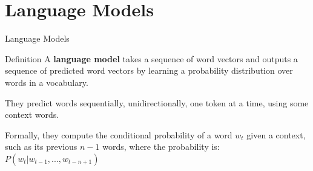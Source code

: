 
\section{Language Models}





\begin{frame}{Language Models}
    
    \begin{definitionBlock}{Definition}
    A \alert{\textbf{language model}} takes a sequence of word vectors and outputs a sequence of predicted word vectors by learning a probability distribution over words in a vocabulary.
    
    They predict words sequentially, unidirectionally, one token at a time, using some context words. 
    
    Formally, they compute the conditional probability of a word $w_t$ given a context, such as its previous $n-1$ words, where the probability is: $P(w_t | w_{t-1}, ..., w_{t-n+1})$
    
    \end{definitionBlock}
    
    
\end{frame}


